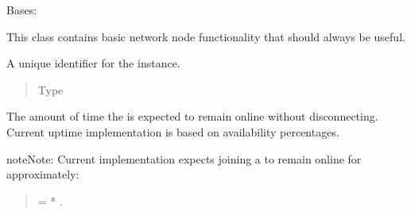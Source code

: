 \documentclass[letterpaper,10pt,english]{sphinxmanual}
\begin{document}
\begin{fulllineitems}
\label{\detokenize{app.domain:app.domain.network_nodes.Node}}
Bases: 

This class contains basic network node functionality that should
always be useful.

\begin{fulllineitems}
\label{\detokenize{app.domain:app.domain.network_nodes.Node.id}}
A unique identifier for the  instance.
\begin{quote}\begin{description}
\item[{Type}] \leavevmode
{}

\end{description}\end{quote}

\end{fulllineitems}


\begin{fulllineitems}
\label{\detokenize{app.domain:app.domain.network_nodes.Node.uptime}}
The amount of time the  is expected to remain online
without disconnecting. Current uptime implementation is based on
availability percentages.

\begin{sphinxadmonition}{note}{Note:}
Current implementation expects  joining a
{\hyperref[\detokenize{app.domain:app.domain.cluster_groups.Cluster}]{}}
to remain online for approximately:
\begin{quote}

 =
{\hyperref[\detokenize{app.domain:app.domain.network_nodes.Node.uptime}]{}}
*
{\hyperref[\detokenize{app.domain:app.domain.master_servers.Master.MAX_EPOCHS}]{}}.
\end{quote}


\end{sphinxadmonition}
\end{fulllineitems}
\end{fulllineitems}
\end{document}
